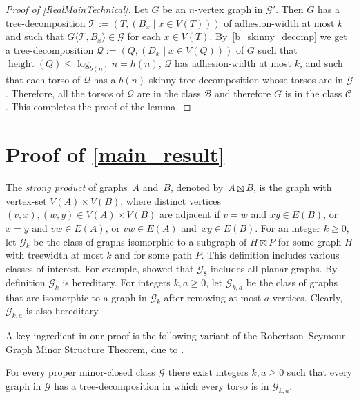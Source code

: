 \documentclass{patmorin}
\renewcommand{\le}{\leqslant}
\renewcommand{\geq}{\geqslant}
\newcommand{\defin}[1]{\emph{\textcolor{brightmaroon}{#1}}}
\newcommand{\torso}[2]{{#1}\langle{#2}\rangle}
\DeclareMathOperator{\height}{height}
\begin{document}
\begin{proof}[Proof of \cref{RealMainTechnical}]
    Let $G$ be an $n$-vertex graph in $\mathcal{G}'$.
    Then $G$ has a tree-decomposition $\mathcal{T}:=(T,(B_x\mid x\in V(T)))$ of adhesion-width at most $k$ and such that $\torso{G}{\mathcal{T},B_x}\in\mathcal{G}$ for each $x\in V(T)$.
By~\cref{b_skinny_decomp} we get a tree-decomposition $\mathcal{Q}:=(Q,(D_x \mid x\in V(Q)))$ of $G$ such that $\height(Q)\le\log_{b(n)} n = h(n)$, $\mathcal{Q}$ has adhesion-width at most $k$, and such that each torso of $\mathcal{Q}$ has a $b(n)$-skinny tree-decomposition whose torsos are in $\mathcal{G}$.
Therefore, all the torsos of $\mathcal{Q}$ are in the class $\mathcal{B}$ and therefore $G$ is in the class $\mathcal{C}$.  This completes the proof of the lemma.
\end{proof}


  \section{Proof of \cref{main_result}}
  \label{gpmst_section}


The \defin{strong product} of graphs~$A$ and~$B$, denoted by~${A \boxtimes B}$, is the graph with vertex-set ${V(A) \times V(B)}$, where distinct vertices ${(v,x),(w,y) \in V(A) \times V(B)}$ are adjacent if
	${v=w}$ and ${xy \in E(B)}$, or
	${x=y}$ and ${vw \in E(A)}$, or
	${vw \in E(A)}$ and~${xy \in E(B)}$.
For an integer $k\geq 0$, let \defin{$\mathcal{G}_{k}$} be the class of graphs isomorphic to a subgraph of $H\boxtimes P$ for some graph $H$ with treewidth at most $k$ and for some path $P$. This definition includes various classes of interest. For example, \citet{dujmovic.joret.ea:planar} showed that
$\mathcal{G}_{8}$ includes all planar graphs.
By definition $\mathcal{G}_k$ is hereditary.
For integers $k,a\geq 0$, let \defin{$\mathcal{G}_{k,a}$} be the class of graphs that are isomorphic to a graph in $\mathcal{G}_k$ after removing at most $a$ vertices.
Clearly, $\mathcal{G}_{k,a}$ is also hereditary.

A key ingredient in our proof is the following variant of the Robertson--Seymour Graph Minor Structure Theorem, due to \citet{dujmovic.joret.ea:planar}.
 \begin{thm}
  \label{gmpst}
  For every proper minor-closed class $\mathcal{G}$ there exist integers $k,a\geq 0$ such that every graph in $\mathcal{G}$ has a tree-decomposition in which every torso is in $\mathcal{G}_{k,a}$.
  \end{thm}
\end{document}
